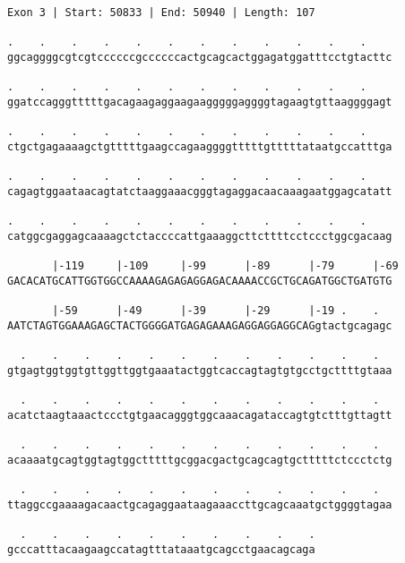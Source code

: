 \documentclass{article}
\begin{document}
\newpage
\begin{Verbatim}[fontfamily=courier]
Exon 3 | Start: 50833 | End: 50940 | Length: 107

.    .    .    .    .    .    .    .    .    .    .    .    
ggcaggggcgtcgtccccccgccccccactgcagcactggagatggatttcctgtacttc

.    .    .    .    .    .    .    .    .    .    .    .    
ggatccagggtttttgacagaagaggaagaagggggaggggtagaagtgttaaggggagt

.    .    .    .    .    .    .    .    .    .    .    .    
ctgctgagaaaagctgtttttgaagccagaaggggtttttgtttttataatgccatttga

.    .    .    .    .    .    .    .    .    .    .    .    
cagagtggaataacagtatctaaggaaacgggtagaggacaacaaagaatggagcatatt

.    .    .    .    .    .    .    .    .    .    .    .    
catggcgaggagcaaaagctctaccccattgaaaggcttcttttcctccctggcgacaag

       |-119     |-109     |-99      |-89      |-79      |-69
GACACATGCATTGGTGGCCAAAAGAGAGAGGAGACAAAACCGCTGCAGATGGCTGATGTG

       |-59      |-49      |-39      |-29      |-19 .    .  
AATCTAGTGGAAAGAGCTACTGGGGATGAGAGAAAGAGGAGGAGGCAGgtactgcagagc

  .    .    .    .    .    .    .    .    .    .    .    .  
gtgagtggtggtgttggttggtgaaatactggtcaccagtagtgtgcctgcttttgtaaa

  .    .    .    .    .    .    .    .    .    .    .    .  
acatctaagtaaactccctgtgaacagggtggcaaacagataccagtgtctttgttagtt

  .    .    .    .    .    .    .    .    .    .    .    .  
acaaaatgcagtggtagtggctttttgcggacgactgcagcagtgctttttctccctctg

  .    .    .    .    .    .    .    .    .    .    .    .  
ttaggccgaaaagacaactgcagaggaataagaaaccttgcagcaaatgctggggtagaa

  .    .    .    .    .    .    .    .    .    .
gcccatttacaagaagccatagtttataaatgcagcctgaacagcaga
\end{Verbatim}
\newpage
\end{document}
